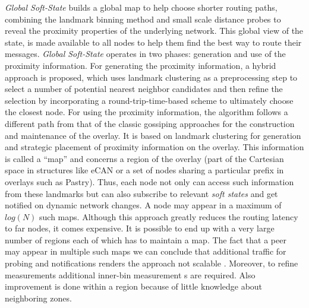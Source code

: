
\emph{Global Soft-State} \cite{XTZ2003} builds a global map to help
choose shorter routing paths, combining the landmark binning method and small
scale distance probes to reveal the proximity properties of the underlying
network. %
This global view of the
state, is made available to all nodes to help them find the best way to
route their messages. \emph{Global Soft-State} operates in two phases:
generation and use of the proximity information. For generating the proximity
information, a hybrid approach is proposed, which uses landmark clustering as a
preprocessing step to select a number of potential nearest neighbor
candidates and then refine the selection by incorporating a
round-trip-time-based scheme to ultimately choose the closest node. For using
the proximity information, the algorithm follows a different path from that of the
classic gossiping approaches for the construction and maintenance of the
overlay. It is based on landmark clustering for generation and strategic
placement of proximity information on the overlay. This information is called a
``map'' and concerns a region of the overlay (part of the Cartesian space in
structures like eCAN\cite{xu_ecan_2002} or a set of nodes sharing a particular
prefix in overlays such as Pastry\cite{antony_pastry_2001}). Thus, each node not
only can access such information from these landmarks but can also subscribe to
relevant \emph{soft states} and get notified on dynamic network changes. A
node may appear in a maximum of $log\left( N \right)$ such
maps.
Although this approach greatly reduces the routing latency to far nodes, it
comes expensive. It is possible to end up with a very large number of regions
each of which has to maintain a map. The fact that a peer may appear in multiple
such maps we can conclude that additional traffic for probing and notifications
renders the approach not scalable \cite{RGJZ2004}. Moreover, to refine measurements
additional inner-bin measurement s are required\cite{WZS2004}. Also improvement
is done within a region because of little knowledge about neighboring zones.

